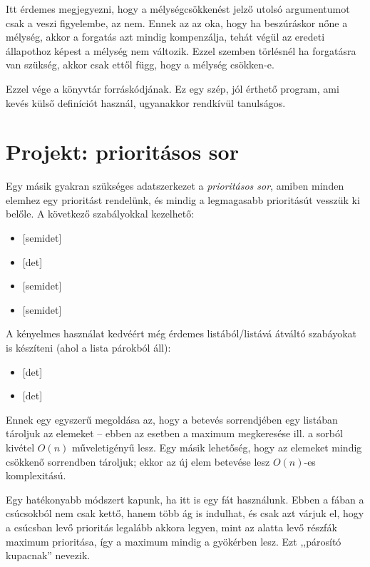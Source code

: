 Itt érdemes megjegyezni, hogy a mélységcsökkenést
jelző utolsó argumentumot csak a 
veszi figyelembe, az  nem. Ennek az az
oka, hogy ha beszúráskor nőne a mélység, akkor a
forgatás azt mindig kompenzálja, tehát végül az
eredeti állapothoz képest a mélység nem
változik. Ezzel szemben törlésnél ha forgatásra van
szükség, akkor csak ettől függ, hogy a mélység
csökken-e.

Ezzel vége a könyvtár forráskódjának. Ez egy szép,
jól érthető program, ami kevés külső definíciót
használ, ugyanakkor rendkívül tanulságos.

\section{Projekt: prioritásos sor}
Egy másik gyakran szükséges adatszerkezet a
\emph{prioritásos sor}, amiben minden elemhez egy
prioritást rendelünk, és mindig a legmagasabb
prioritásút vesszük ki belőle. A következő
szabályokkal kezelhető:
\begin{itemize}
\item {} [semidet]
\item {} [det]
\item {} [semidet]
\item {}
  \begin{sloppypar}[semidet]\end{sloppypar}
\end{itemize}
A kényelmes használat kedvéért még érdemes
listából/listává átváltó szabáyokat is készíteni
(ahol a lista  párokból áll):
\begin{itemize}
\item {} [det]
\item {} [det]
\end{itemize}
Ennek egy egyszerű megoldása az, hogy a betevés
sorrendjében egy listában tároljuk az elemeket --
ebben az esetben a maximum megkeresése ill. a sorból
kivétel $O(n)$ műveletigényű lesz. Egy másik
lehetőség, hogy az elemeket mindig csökkenő
sorrendben tároljuk; ekkor az új elem betevése lesz
$O(n)$-es komplexitású.

Egy hatékonyabb módszert kapunk, ha itt is egy fát
használunk. Ebben a fában a csúcsokból nem csak
kettő, hanem több ág is indulhat, és csak azt várjuk
el, hogy a csúcsban levő prioritás legalább akkora
legyen, mint az alatta levő részfák maximum
prioritása, így a maximum mindig a gyökérben
lesz. Ezt ,,párosító kupacnak'' nevezik.

